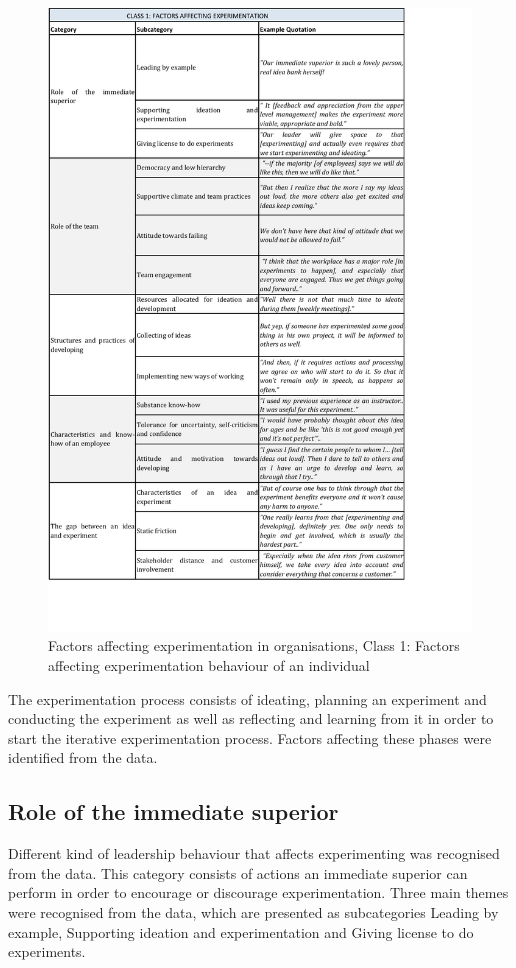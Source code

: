 \begin{figure}[!H]
\vspace{-20pt}
\hspace{-25pt}
\includegraphics{class1.pdf}
\vspace{-80pt}
\caption{Factors affecting experimentation in organisations, Class 1: Factors affecting experimentation behaviour of an individual}
\label{tbl:class1}
\end{figure}


The experimentation process consists of ideating, planning an experiment and conducting the experiment as well as reflecting and learning from it in order to start the iterative experimentation process. Factors affecting these phases were identified from the data. 

\subsection{Role of the immediate superior}
Different kind of leadership behaviour that affects experimenting was recognised from the data. This category consists of actions an immediate superior can perform in order to encourage or discourage experimentation. Three main themes were recognised from the data, which are presented as subcategories Leading by example, Supporting ideation and experimentation and Giving license to do experiments.

